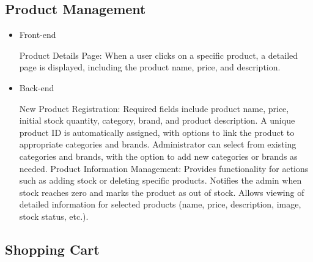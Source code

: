 \documentclass[conference]{IEEEtran}
\begin{document}
\subsection{Product Management}

\begin{itemize}
\setlength{\parindent}{2ex}
\setlength{\parskip}{0.5em}
\item Front-end

Product Details Page: When a user clicks on a specific product, a detailed page is displayed, including the product name, price, and description.

\item Back-end

New Product Registration: Required fields include product name, price, initial stock quantity, category, brand, and product description. A unique product ID is automatically assigned, with options to link the product to appropriate categories and brands. Administrator can select from existing categories and brands, with the option to add new categories or brands as needed. \newline\hspace*{1.2ex}
Product Information Management: Provides functionality for actions such as adding stock or deleting specific products. Notifies the admin when stock reaches zero and marks the product as out of stock. Allows viewing of detailed information for selected products (name, price, description, image, stock status, etc.).



\end{itemize}

\subsection{Shopping Cart}
\end{document}
